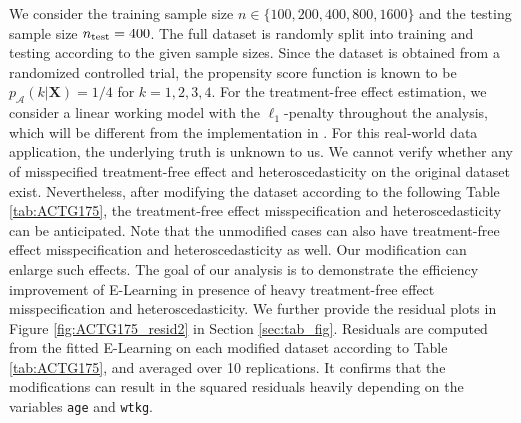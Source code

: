\documentclass[11pt]{article}
\numberwithin{equation}{section}
\theoremstyle{definition}
\theoremstyle{remark}
\newcommand{\bX}{\bm{X}}
\newcommand{\sA}{\mathscr{A}}
\begin{document}
We consider the training sample size $ n \in \{100,200,400,800,1600\} $ and the testing sample size $ n_{\rm test} = 400 $. The full  dataset is randomly split into training and testing according to the given sample sizes. Since the dataset is obtained from a randomized controlled trial, the propensity score function is known to be $ p_{\sA}(k|\bX) = 1/4 $ for $ k = 1,2,3,4 $. For the treatment-free effect estimation, we consider a linear working model with the $ \ell_{1} $-penalty throughout the analysis, which will be different from the implementation in \citet{meng2020robust}. For this real-world data application, the underlying truth is unknown to us. We cannot verify whether any of misspecified treatment-free effect and heteroscedasticity on the original dataset exist. Nevertheless, after modifying the dataset according to the following Table \ref{tab:ACTG175}, the treatment-free effect misspecification and heteroscedasticity can be anticipated. Note that the unmodified cases can also have treatment-free effect misspecification and heteroscedasticity as well. Our modification can enlarge such effects. The goal of our analysis is to demonstrate the efficiency improvement of E-Learning in presence of heavy treatment-free effect misspecification and heteroscedasticity. We further provide the residual plots in Figure \ref{fig:ACTG175_resid2} in Section \ref{sec:tab_fig}. Residuals are computed from the fitted E-Learning on each modified dataset according to Table \ref{tab:ACTG175}, and averaged over 10 replications. It confirms that the modifications can result in the squared residuals heavily depending on the variables \texttt{age} and \texttt{wtkg}.
\end{document}
